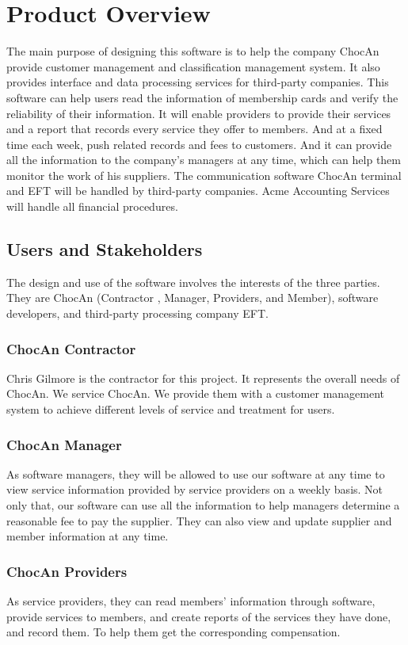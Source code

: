\documentclass{article}
\begin{document}
\section{Product Overview}
The main purpose of designing this software is to help the company ChocAn provide customer management and classification management system. It also provides interface and data processing services for third-party companies. This software can help users read the information of membership cards and verify the reliability of their information. It will enable providers to provide their services and a report that records every service they offer to members. And at a fixed time each week, push related records and fees to customers. And it can provide all the information to the company's managers at any time, which can help them monitor the work of his suppliers. The communication software ChocAn terminal and EFT will be handled by third-party companies. Acme Accounting Services will handle all financial procedures.

\subsection{Users and Stakeholders}
The design and use of the software involves the interests of the three parties. They are ChocAn (Contractor , Manager, Providers, and Member), software developers, and third-party processing company EFT. 

\subsubsection{ChocAn Contractor}
Chris Gilmore is the contractor for this project. It represents the overall needs of ChocAn. We service ChocAn. We provide them with a customer management system to achieve different levels of service and treatment for users.

\subsubsection{ChocAn Manager}
As software managers, they will be allowed to use our software at any time to view service information provided by service providers on a weekly basis. Not only that, our software can use all the information to help managers determine a reasonable fee to pay the supplier. They can also view and update supplier and member information at any time.

\subsubsection{ChocAn Providers}
As service providers, they can read members' information through software, provide services to members, and create reports of the services they have done, and record them. To help them get the corresponding compensation.
\end{document}
